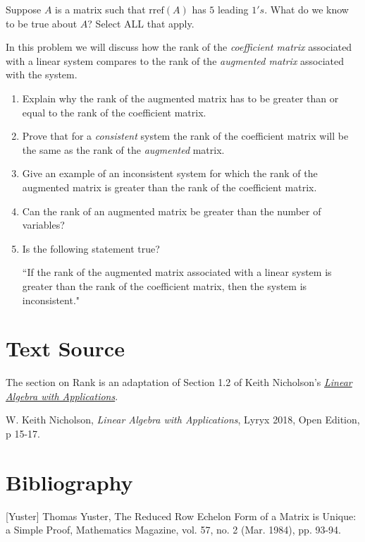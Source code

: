 \documentclass{ximera}
\begin{document}
\begin{problem}\label{prob:leadones}
Suppose $A$ is a matrix such that $\mbox{rref}(A)$ has $5$ leading $1's$.  What do we know to be true about $A$?  Select ALL that apply.
\begin{selectAll}
 \end{selectAll}
\end{problem}

\begin{problem}\label{prob:rankaugvscoeff}
In this problem we will discuss how the rank of the {\it coefficient matrix} associated with a linear system compares to the rank of the {\it augmented matrix} associated with the system.  
\begin{enumerate}
\item Explain why the rank of the augmented matrix has to be greater than or equal to the rank of the coefficient matrix.
    \item Prove that for a {\it consistent} system the rank of the coefficient matrix will be the same as the rank of the {\it augmented} matrix.
    \item Give an example of an inconsistent system for which the rank of the augmented matrix is greater than the rank of the coefficient matrix.
    \item Can the rank of an augmented matrix be greater than the number of variables?
    \item Is the following statement true?
    
    ``If the rank of the augmented matrix associated with a linear system is greater than the rank of the coefficient matrix, then the system is inconsistent."
\end{enumerate}
\end{problem}

\section*{Text Source}
The section on Rank is an adaptation of Section 1.2 of Keith Nicholson's \href{https://open.umn.edu/opentextbooks/textbooks/linear-algebra-with-applications}{\it Linear Algebra with Applications}.

W. Keith Nicholson, {\it Linear Algebra with Applications}, Lyryx 2018, Open Edition, p 15-17.

\section*{Bibliography}

[Yuster] Thomas Yuster, The Reduced Row Echelon Form of a Matrix is Unique: a
Simple Proof, Mathematics Magazine, vol. 57, no. 2 (Mar. 1984), pp. 93-94.
\end{document}
